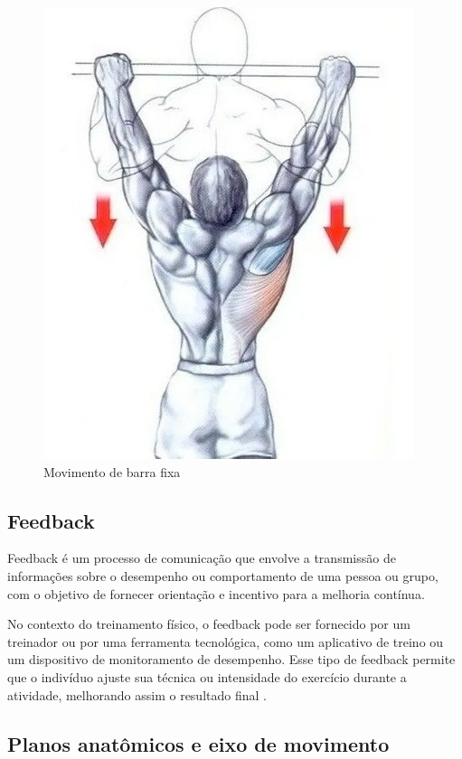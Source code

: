 \begin{figure}[!htb]
	\centering
	\includegraphics[scale=0.45]{figuras/TAF/barraFixa.jpg}
	\caption{Movimento de barra fixa}
	\label{fig:Movimento de barra fixa}
\end{figure}


\subsection[Feedback]{Feedback}

Feedback é um processo de comunicação que envolve a transmissão de informações sobre o desempenho ou comportamento de uma pessoa ou grupo, com o objetivo de fornecer orientação e incentivo para a melhoria contínua. 

No contexto do treinamento físico, o feedback pode ser fornecido por um treinador ou por uma ferramenta tecnológica, como um aplicativo de treino ou um dispositivo de monitoramento de desempenho. Esse tipo de feedback permite que o indivíduo ajuste sua técnica ou intensidade do exercício durante a atividade, melhorando assim o resultado final \cite{feedback}.




\subsection[Planos anatômicos e eixo de movimento]{Planos anatômicos e eixo de movimento}

